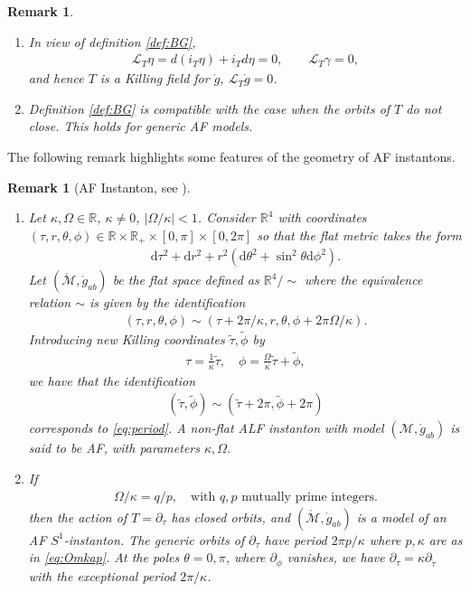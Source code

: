 \documentclass[a4paper,10pt,reqno]{amsart}
\newcommand{\Reals}{\mathbb{R}}
\newcommand{\cM}{\mathcal{M}}
\theoremstyle{plain}
\newtheorem{remark}[thm]{Remark}
\renewcommand{\d}{\mathrm{d}}
\newcommand{\Lie}{\mathcal{L}}
\newcommand{\gring}{\mathring{g}}
\numberwithin{equation}{section}
\begin{document}
\begin{remark} \label{rem:T}
\begin{enumerate} 
\item In view of definition \ref{def:BG},
\begin{align} 
\Lie_T \eta = d(i_T \eta) + i_T d\eta = 0,
\qquad
\Lie_T \gamma = 0,
\end{align} 
and hence $T$ is a Killing field for $\gring$,
$\Lie_T \gring = 0$.
\item 
Definition \ref{def:BG} is compatible with the case when the orbits of $T$ do not close. This holds for generic AF models. 
\end{enumerate} 
\end{remark} 

The following remark highlights some features of the geometry of AF instantons. 
\begin{remark}[AF Instanton, see ] \label{def:AF} 
\begin{enumerate} 
\item 
Let $\kappa, \Omega \in \Reals$, $\kappa \ne 0$, $|\Omega/\kappa| < 1$. Consider $\Reals^4$ with coordinates $(\tau, r, \theta, \phi) \in \Reals \times \Reals_+ \times [0,\pi] \times [0,2\pi]$ so that the flat metric takes the form 
\begin{align} 
\d\tau^2 + \d r^2 + r^2(\d\theta^2 + \sin^2\theta \d\phi^2) .
\end{align} 
Let $(\mathring{\cM}, \mathring{g}_{ab})$ be the flat space defined as $\Reals^4/\sim$ where the equivalence relation $\sim$ is given by the identification 
\begin{align}\label{eq:period} 
(\tau, r,\theta,\phi) \sim (\tau+2\pi/\kappa,r,\theta,\phi + 2\pi\Omega/\kappa) .
\end{align}
Introducing new Killing coordinates $\tilde\tau, \tilde\phi$ by 
\begin{align} 
\tau = \frac{1}{\kappa} \tilde \tau, \quad \phi = \frac{\Omega}{\kappa} \tilde \tau + \tilde \phi , 
\end{align} 
we have that the identification 
\begin{align} \label{eq:tperiod}
(\tilde\tau, \tilde\phi)\sim (\tilde \tau + 2\pi, \tilde \phi + 2\pi) 
\end{align} 
corresponds to \eqref{eq:period}. 
A non-flat ALF instanton with model $(\cM, \mathring{g}_{ab})$ is said to be AF, with parameters $\kappa, \Omega$.
\item If  
\begin{align} \label{eq:Omkap} 
\Omega/\kappa = q/p, \quad \text{with $q,p$ mutually prime integers.}
\end{align} 
then the action of $T = \partial_\tau$ has closed orbits, and $(\mathring{\cM}, \mathring{g}_{ab})$ is a model of an AF $S^1$-instanton. The generic orbits of $\partial_\tau$ have period $2\pi p/\kappa$ where $p,\kappa$ are as in \eqref{eq:Omkap}. At the poles $\theta = 0,\pi$, where $\partial_\phi$ vanishes, we have $\partial_\tau = \kappa \partial_{\tilde \tau}$ with the exceptional period $2\pi/\kappa$. 
\end{enumerate}
\end{remark} 
\end{document}
